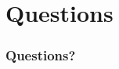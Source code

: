 \documentclass[aspectratio=169,11pt,hyperref={colorlinks=true}]{beamer}
\begin{document}
\section{Questions}
\begin{frame}
\frametitle{Questions?}
\end{frame}

\end{document}
